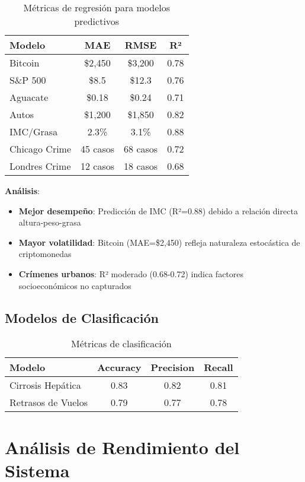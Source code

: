 \begin{table}[h]
\centering
\begin{tabular}{|l|c|c|c|}
\hline
\textbf{Modelo} & \textbf{MAE} & \textbf{RMSE} & \textbf{R²} \\
\hline
Bitcoin & \$2,450 & \$3,200 & 0.78 \\
S\&P 500 & \$8.5 & \$12.3 & 0.76 \\
Aguacate & \$0.18 & \$0.24 & 0.71 \\
Autos & \$1,200 & \$1,850 & 0.82 \\
IMC/Grasa & 2.3\% & 3.1\% & 0.88 \\
Chicago Crime & 45 casos & 68 casos & 0.72 \\
Londres Crime & 12 casos & 18 casos & 0.68 \\
\hline
\end{tabular}
\caption{Métricas de regresión para modelos predictivos}
\label{tab:regression_metrics}
\end{table}

\textbf{Análisis}: 
\begin{itemize}
    \item \textbf{Mejor desempeño}: Predicción de IMC (R²=0.88) debido a relación directa altura-peso-grasa
    \item \textbf{Mayor volatilidad}: Bitcoin (MAE=\$2,450) refleja naturaleza estocástica de criptomonedas
    \item \textbf{Crímenes urbanos}: R² moderado (0.68-0.72) indica factores socioeconómicos no capturados
\end{itemize}

\subsection{Modelos de Clasificación}

\begin{table}[h]
\centering
\begin{tabular}{|l|c|c|c|}
\hline
\textbf{Modelo} & \textbf{Accuracy} & \textbf{Precision} & \textbf{Recall} \\
\hline
Cirrosis Hepática & 0.83 & 0.82 & 0.81 \\
Retrasos de Vuelos & 0.79 & 0.77 & 0.78 \\
\hline
\end{tabular}
\caption{Métricas de clasificación}
\label{tab:classification_metrics}
\end{table}

\section{Análisis de Rendimiento del Sistema}

